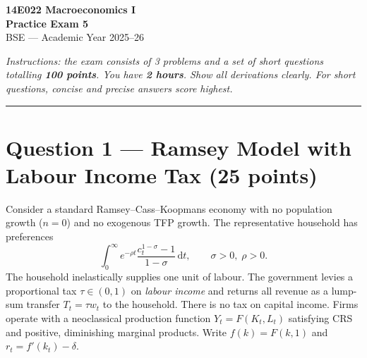 \documentclass[a4paper,11pt]{article}
\newcommand{\dd}{\mathrm{d}}
\begin{document}

\begin{center}
    {\LARGE \textbf{14E022 Macroeconomics I}}\\[6pt]
    {\Large \textbf{Practice Exam 5}}\\[8pt]
    {\large BSE --- Academic Year 2025--26}
\end{center}

\vspace{8pt}
\noindent\textit{Instructions: the exam consists of 3 problems and a set of short questions
totalling \textbf{100 points}. You have \textbf{2 hours}. Show all derivations clearly.
For short questions, concise and precise answers score highest.}
\vspace{4pt}

\noindent\rule{\textwidth}{0.4pt}

\section{Question 1 --- Ramsey Model with Labour Income Tax \hfill (25 points)}

Consider a standard Ramsey--Cass--Koopmans economy with no population growth ($n=0$) and
no exogenous TFP growth. The representative household has preferences
\[
    \int_0^\infty e^{-\rho t}\frac{c_t^{1-\sigma}-1}{1-\sigma}\,\dd t,
    \qquad \sigma > 0,\;\rho > 0.
\]
The household inelastically supplies one unit of labour. The government levies a
proportional tax $\tau \in (0,1)$ on \emph{labour income} and returns all revenue as a
lump-sum transfer $T_t = \tau w_t$ to the household. There is no tax on capital income.
Firms operate with a neoclassical production function $Y_t = F(K_t, L_t)$ satisfying CRS
and positive, diminishing marginal products. Write $f(k) = F(k,1)$ and
$r_t = f'(k_t) - \delta$.
\end{document}
